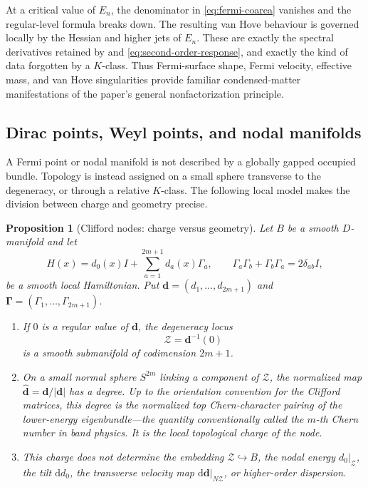 \documentclass[11pt]{article}
\newtheorem{proposition}[theorem]{Proposition}
\theoremstyle{definition}
\theoremstyle{remark}
\newcommand{\dd}{\mathrm d}
\begin{document}
At a critical value of \(E_n\), the denominator in
\eqref{eq:fermi-coarea} vanishes and the regular-level formula breaks down.
The resulting van Hove behaviour is governed locally by the Hessian and
higher jets of \(E_n\).  These are exactly the spectral derivatives retained
by  and \eqref{eq:second-order-response}, and exactly
the kind of data forgotten by a \(K\)-class.  Thus Fermi-surface shape,
Fermi velocity, effective mass, and van Hove singularities provide familiar
condensed-matter manifestations of the paper's general nonfactorization
principle.

\subsection{Dirac points, Weyl points, and nodal manifolds}

A Fermi point or nodal manifold is not described by a globally gapped
occupied bundle.  Topology is instead assigned on a small sphere transverse
to the degeneracy, or through a relative \(K\)-class.  The following local
model makes the division between charge and geometry precise.

\begin{proposition}[Clifford nodes: charge versus geometry]
\label{prop:clifford-nodes}
Let \(B\) be a smooth \(D\)-manifold and let
\[
        H(x)=d_0(x)I+\sum_{a=1}^{2m+1}d_a(x)\Gamma_a,
        \qquad
        \Gamma_a\Gamma_b+\Gamma_b\Gamma_a=2\delta_{ab}I,
        \tag{8.8}\label{eq:clifford-hamiltonian}
\]
be a smooth local Hamiltonian.  Put
\(\bm d=(d_1,\ldots,d_{2m+1})\) and
\(\bm\Gamma=(\Gamma_1,\ldots,\Gamma_{2m+1})\).

\begin{enumerate}[label=\textup{(\alph*)},leftmargin=2.5em]
\item If \(0\) is a regular value of \(\bm d\), the degeneracy locus
  \[
                         \mathcal Z=\bm d^{-1}(0)
                         \tag{8.9}\label{eq:nodal-locus}
  \]
  is a smooth submanifold of codimension \(2m+1\).

\item On a small normal sphere
  \(S^{2m}\) linking a component of \(\mathcal Z\), the normalized map
  \(\widehat{\bm d}=\bm d/|\bm d|\) has a degree.  Up to the orientation
  convention for the Clifford matrices, this degree is the normalized top
  Chern-character pairing of the lower-energy eigenbundle---the quantity
  conventionally called the \(m\)-th Chern number in band physics.  It is
  the local topological charge of the node.

\item This charge does not determine the embedding
  \(\mathcal Z\hookrightarrow B\), the nodal energy \(d_0|_{\mathcal Z}\),
  the tilt \(\dd d_0\), the transverse velocity map
  \(\dd\bm d|_{N\mathcal Z}\), or higher-order dispersion.
\end{enumerate}
\end{proposition}
\end{document}
